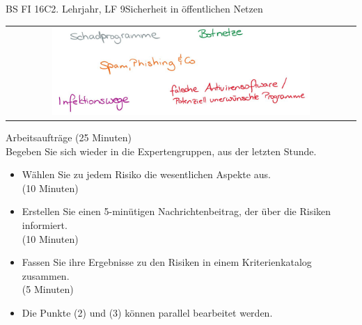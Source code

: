 \documentclass[oneside,openany,headings=optiontotoc,11pt,numbers=noenddot]{scrreprt}
\begin{document}
\begin{worksheet}{BS FI 16C}{2. Lehrjahr, LF 9}{Sicherheit in öffentlichen Netzen}
		\newpage
		\setcounter{page}{1}
		\noindent
		\begin{framed}
			\begin{tabular}{lcr}
				& \includegraphics[width=0.8\textwidth]{Bilder/Gefahren.jpg} &
			\end{tabular}
		\end{framed}
		
		\color{codegray}Arbeitsaufträge (25 Minuten)\\
		\color{black}
		Begeben Sie sich wieder in die Expertengruppen, aus der letzten Stunde.
		\begin{itemize}
			\item[(1)] Wählen Sie zu jedem Risiko die wesentlichen Aspekte aus.\\ (10 Minuten)
			\item[(2)]Erstellen Sie einen 5-minütigen Nachrichtenbeitrag, der über die Risiken informiert.\\(10 Minuten)
			\item[(3)] Fassen Sie ihre Ergebnisse zu den Risiken in einem Kriterienkatalog zusammen.\\ (5 Minuten)
			\item[] \tiny Die Punkte (2) und (3) können parallel bearbeitet werden.
		\end{itemize}
	\end{worksheet}
\end{document}

